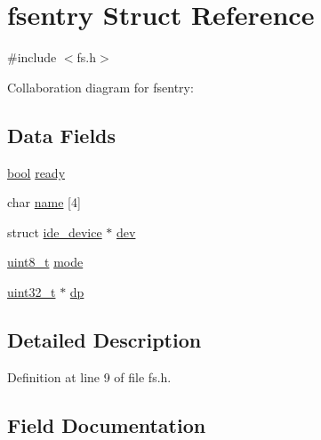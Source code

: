 \hypertarget{a00272}{}\section{fsentry Struct Reference}
\label{a00272}


{\ttfamily \#include $<$fs.\+h$>$}



Collaboration diagram for fsentry\+:
\subsection*{Data Fields}
\begin{DoxyCompactItemize}
\item 
\hyperlink{a00140_af6a258d8f3ee5206d682d799316314b1_af6a258d8f3ee5206d682d799316314b1}{bool} \hyperlink{a00272_a284522ed97fe1eeebd0fcc039b2ea00a_a284522ed97fe1eeebd0fcc039b2ea00a}{ready}
\item 
char \hyperlink{a00272_a9c5a4f5b02eb2c9e9e797f79dc99028a_a9c5a4f5b02eb2c9e9e797f79dc99028a}{name} \mbox{[}4\mbox{]}
\item 
struct \hyperlink{a00224}{ide\+\_\+device} $\ast$ \hyperlink{a00272_aaea66ea744fa50f1c54666033884d8d2_aaea66ea744fa50f1c54666033884d8d2}{dev}
\item 
\hyperlink{a00140_aba7bc1797add20fe3efdf37ced1182c5_aba7bc1797add20fe3efdf37ced1182c5}{uint8\+\_\+t} \hyperlink{a00272_a6e71712bc3c51c21dc3362334937e4d7_a6e71712bc3c51c21dc3362334937e4d7}{mode}
\item 
\hyperlink{a00140_a435d1572bf3f880d55459d9805097f62_a435d1572bf3f880d55459d9805097f62}{uint32\+\_\+t} $\ast$ \hyperlink{a00272_ae1d22893563b8753e29fef01f0782ba5_ae1d22893563b8753e29fef01f0782ba5}{dp}
\end{DoxyCompactItemize}


\subsection{Detailed Description}


Definition at line 9 of file fs.\+h.



\subsection{Field Documentation}
\mbox{\label{a00272_aaea66ea744fa50f1c54666033884d8d2_aaea66ea744fa50f1c54666033884d8d2}} 
